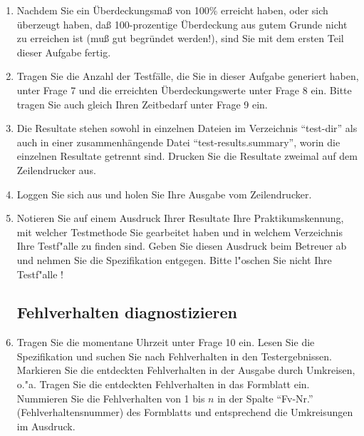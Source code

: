 \begin{enumerate}
\item Nachdem Sie ein \"Uberdeckungsma{\ss} von 100\% erreicht haben,
oder sich \"uberzeugt haben, da{\ss} 100-prozentige \"Uberdeckung aus
gutem Grunde nicht zu erreichen ist (mu{\ss} gut begr\"undet
werden!), sind Sie mit dem ersten Teil dieser Aufgabe fertig.

\item Tragen Sie die Anzahl der Testf\"alle, die Sie in dieser Aufgabe
generiert haben,  unter Frage 7 und die erreichten \"Uberdeckungswerte
unter Frage 8 ein.  
Bitte tragen Sie auch gleich Ihren Zeitbedarf unter Frage 9 ein.

\item Die Resultate stehen sowohl in einzelnen Dateien im Verzeichnis 
"`test-dir"' als auch in einer zusammenh\"angende Datei
"`test-results.summary"', worin die einzelnen Resultate getrennt sind.
Drucken Sie die Resultate zweimal auf dem Zeilendrucker aus. 

\item Loggen Sie sich aus und holen Sie Ihre Ausgabe vom Zeilendrucker.

\item Notieren Sie auf einem Ausdruck Ihrer Resultate Ihre Praktikumskennung,
mit welcher Testmethode Sie gearbeitet haben und in welchem Verzeichnis
Ihre Testf"alle zu finden sind. Geben Sie diesen Ausdruck
beim Betreuer ab und nehmen Sie die Spezifikation entgegen. Bitte l"oschen Sie
nicht Ihre Testf"alle !



\subsection*{Fehlverhalten diagnostizieren}

\item Tragen Sie die momentane Uhrzeit unter Frage 10 ein.
Lesen Sie die Spezifikation und suchen Sie nach Fehlverhalten in den
Testergebnissen. Markieren Sie die entdeckten Fehlverhalten in der Ausgabe
durch Umkreisen, o."a. Tragen Sie die entdeckten Fehlverhalten in das 
Formblatt ein.  Nummieren Sie die Fehlverhalten von 1 bis $n$ in der
Spalte "`Fv-Nr."' (Fehlverhaltensnummer) des Formblatts und entsprechend
die Umkreisungen im Ausdruck.



\end{enumerate}
